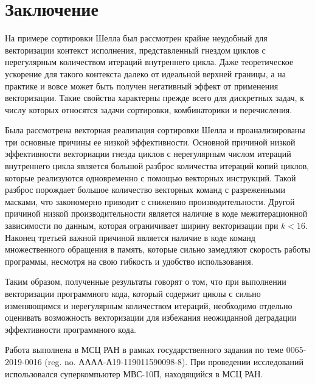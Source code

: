 \documentclass[utf8]{psta}
\begin{document}
\section*{Заключение}

На примере сортировки Шелла был рассмотрен крайне неудобный для векторизации контекст исполнения, представленный гнездом циклов с нерегулярным количеством итераций внутреннего цикла.
Даже теоретическое ускорение для такого контекста далеко от идеальной верхней границы, а на практике и вовсе может быть получен негативный эффект от применения векторизации.
Такие свойства характерны прежде всего для дискретных задач, к числу которых относятся задачи сортировки, комбинаторики и перечисления.

Была рассмотрена векторная реализация сортировки Шелла и проанализированы три основные причины ее низкой эффективности.
Основной причиной низкой эффективности векториации гнезда циклов с нерегулярным числом итераций внутреннего цикла является большой разброс количества итераций копий циклов, которые реализуются одновременно с помощью векторных инструкций.
Такой разброс порождает большое количество векторных команд с разреженными масками, что закономерно приводит с снижению производительности.
Другой причиной низкой производительности является наличие в коде межитерационной зависимости по данным, которая ограничивает ширину векторизации при $k < 16$.
Наконец третьей важной причиной является наличие в коде команд множественного обращения в память, которые сильно замедляют скорость работы программы, несмотря на свою гибкость и удобство использования.

Таким образом, полученные результаты говорят о том, что при выполнении векторизации программного кода, который содержит циклы с сильно изменяющимся и нерегулярным количеством итераций, необходимо отдельно оценивать возможность векторизации для избежания неожиданной деградации эффективности программного кода.

Работа выполнена в МСЦ РАН в рамках государственного задания по теме 0065-2019-0016 (reg. no. АААА-А19-119011590098-8). При проведении исследований использовался суперкомпьютер МВС-10П, находящийся в МСЦ РАН.
\end{document}
